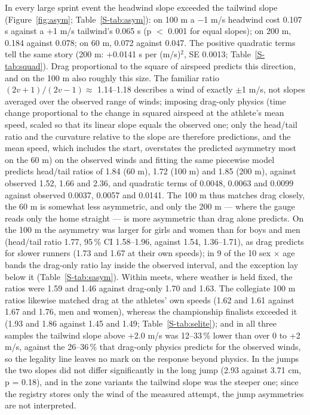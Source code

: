 \documentclass[12pt,a4paper]{article}
\begin{document}
In every large sprint event the headwind slope exceeded the tailwind slope (Figure~\ref{fig:asym}; Table~\ref{S-tab:asym}): on 100 m a $-$1 m/s headwind cost 0.107 s against a +1 m/s tailwind's 0.065 s (p $<$ 0.001 for equal slopes); on 200 m, 0.184 against 0.078; on 60 m, 0.072 against 0.047. The positive quadratic terms tell the same story (200 m: +0.0141 s per (m/s)$^2$, SE 0.0013; Table~\ref{S-tab:squad}). Drag proportional to the square of airspeed predicts this direction, and on the 100 m also roughly this size. The familiar ratio $(2v+1)/(2v-1) \approx$ 1.14--1.18 describes a wind of exactly $\pm$1 m/s, not slopes averaged over the observed range of winds; imposing drag-only physics (time change proportional to the change in squared airspeed at the athlete's mean speed, scaled so that its linear slope equals the observed one; only the head/tail ratio and the curvature relative to the slope are therefore predictions, and the mean speed, which includes the start, overstates the predicted asymmetry most on the 60 m) on the observed winds and fitting the same piecewise model predicts head/tail ratios of 1.84 (60 m), 1.72 (100 m) and 1.85 (200 m), against observed 1.52, 1.66 and 2.36, and quadratic terms of 0.0048, 0.0063 and 0.0099 against observed 0.0037, 0.0057 and 0.0141. The 100 m thus matches drag closely, the 60 m is somewhat less asymmetric, and only the 200 m --- where the gauge reads only the home straight --- is more asymmetric than drag alone predicts. On the 100 m the asymmetry was larger for girls and women than for boys and men (head/tail ratio 1.77, 95\,\% CI 1.58--1.96, against 1.54, 1.36--1.71), as drag predicts for slower runners (1.73 and 1.67 at their own speeds); in 9 of the 10 sex $\times$ age bands the drag-only ratio lay inside the observed interval, and the exception lay below it (Table~\ref{S-tab:sasym}). Within meets, where weather is held fixed, the ratios were 1.59 and 1.46 against drag-only 1.70 and 1.63. The collegiate 100 m ratios likewise matched drag at the athletes' own speeds (1.62 and 1.61 against 1.67 and 1.76, men and women), whereas the championship finalists exceeded it (1.93 and 1.86 against 1.45 and 1.49; Table~\ref{S-tab:selite}); and in all three samples the tailwind slope above +2.0 m/s was 12--33\,\% lower than over 0 to +2 m/s, against the 26--36\,\% that drag-only physics predicts for the observed winds, so the legality line leaves no mark on the response beyond physics. In the jumps the two slopes did not differ significantly in the long jump (2.93 against 3.71 cm, p = 0.18), and in the zone variants the tailwind slope was the steeper one; since the registry stores only the wind of the measured attempt, the jump asymmetries are not interpreted.
\end{document}
